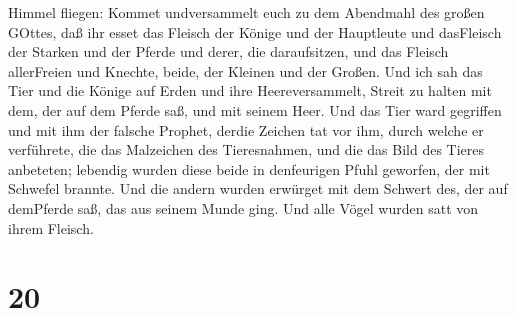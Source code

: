 Himmel fliegen: Kommet undversammelt euch zu dem Abendmahl des großen
GOttes,  daß ihr esset das Fleisch der Könige und der
Hauptleute und dasFleisch der Starken und der Pferde und derer, die
daraufsitzen, und das Fleisch allerFreien und Knechte, beide, der
Kleinen und der Großen.  Und ich sah das Tier und die
Könige auf Erden und ihre Heereversammelt, Streit zu halten mit dem, der
auf dem Pferde saß, und mit seinem Heer.  Und das Tier ward
gegriffen und mit ihm der falsche Prophet, derdie Zeichen tat vor ihm,
durch welche er verführete, die das Malzeichen des Tieresnahmen, und die
das Bild des Tieres anbeteten; lebendig wurden diese beide in
denfeurigen Pfuhl geworfen, der mit Schwefel brannte.  Und
die andern wurden erwürget mit dem Schwert des, der auf demPferde saß,
das aus seinem Munde ging. Und alle Vögel wurden satt von ihrem Fleisch.

\hypertarget{section-18}{%
\section{20}\label{section-18}}

